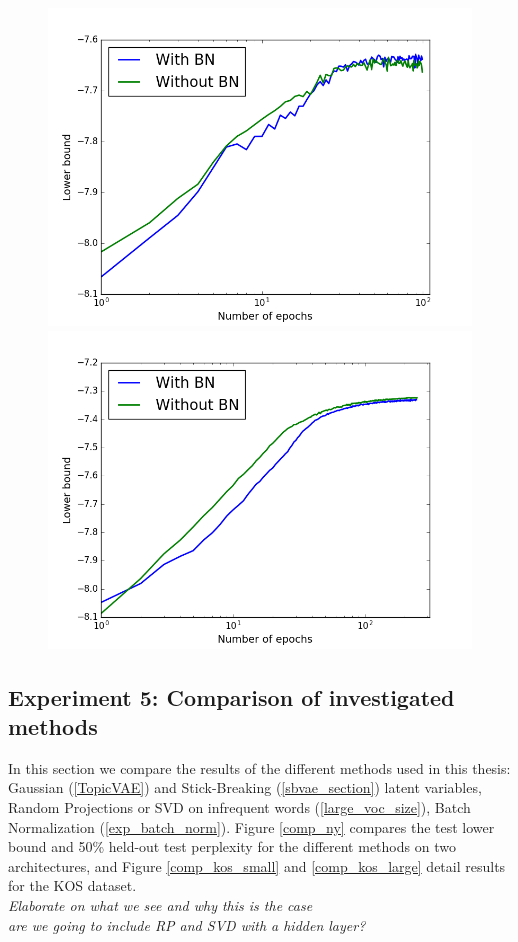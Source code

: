 \documentclass{report}
\begin{document}
	\begin{figure}\label{bn_kos}
		\includegraphics[scale = 0.45]{img/bn_kos_test.png}
		\includegraphics[scale = 0.45]{img/bn_ny_test.png}
	\end{figure}
	\subsection{Experiment 5: Comparison of investigated methods}\label{comp_methods}
	In this section we compare the results of the different methods used in this thesis: Gaussian (\ref{TopicVAE}) and Stick-Breaking (\ref{sbvae_section}) latent variables, Random Projections or SVD on infrequent words (\ref{large_voc_size}), Batch Normalization (\ref{exp_batch_norm}). Figure \ref{comp_ny} compares the test lower bound and 50\% held-out test perplexity for the different methods on two architectures, and Figure \ref{comp_kos_small} and \ref{comp_kos_large} detail results for the KOS dataset. \\
	\textit{Elaborate on what we see and why this is the case}\\
	\textit{are we going to include RP and SVD with a hidden layer?}
	
\end{document}
